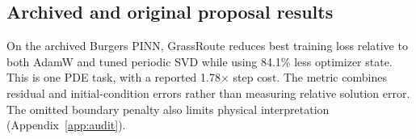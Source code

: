 \subsection{Archived and original proposal results}
\label{app:full-results}
\begin{table}[ht]
\centering\small
\caption{Tuned historical summaries. Accuracy and Recall@20 are percentages.
SciML reports best training loss; its SGD proxy measures a different quantity
and is omitted. These selected historical scores, often the best observed
test accuracy, are separate from the extension's final held-out scores.}
\label{tab:archive}
\end{table}

On the archived Burgers PINN, GrassRoute reduces best training loss relative
to both AdamW and tuned periodic SVD while using 84.1\% less optimizer
state. This is one PDE task, with a reported 1.78$\times$ step cost. The
metric combines residual and initial-condition errors rather than measuring
relative solution error. The omitted boundary penalty also limits physical
interpretation (Appendix~\ref{app:audit}).

